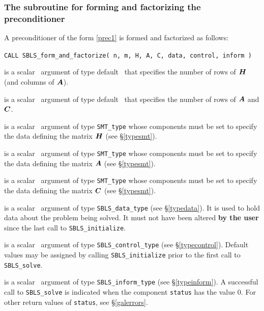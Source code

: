 \documentclass{galahad}
\newcommand{\packagename}{SBLS}
\begin{document}

\subsubsection{The subroutine for forming and factorizing the preconditioner}
A preconditioner of the form \ref{prec1} is formed and factorized as follows:
\vspace*{1mm}

\hspace{8mm}
{\tt CALL \packagename\_form\_and\_factorize( n, m, H, A, C, data, control, inform )}

\begin{description}
 is a scalar \intentin\ argument of type default \integer\ that specifies
the number of rows of ${\bm{H}}$ (and columns of ${\bm{A}}$).

 is a scalar \intentin\ argument of type default \integer\ that specifies
the number of rows of ${\bm{A}}$ and ${\bm{C}}$.

 is a scalar \intentin\ argument of type {\tt SMT\_type} whose
components must be set to specify the data defining the matrix ${\bm{H}}$ 
(see \S\ref{typesmt}).

 is a scalar \intentin\ argument of type {\tt SMT\_type} whose
components must be set to specify the data defining the matrix ${\bm{A}}$ 
(see \S\ref{typesmt}).

 is a scalar \intentin\ argument of type {\tt SMT\_type} whose
components must be set to specify the data defining the matrix ${\bm{C}}$ 
(see \S\ref{typesmt}).

 is a scalar \intentinout\ argument of type 
{\tt \packagename\_data\_type}
(see \S\ref{typedata}). It is used to hold data about the problem being 
solved. It must not have been altered {\bf by the user} since the last call to 
{\tt \packagename\_initialize}.

 is a scalar \intentin\ argument of type 
{\tt \packagename\_control\_type}
(see \S\ref{typecontrol}). Default values may be assigned by calling 
{\tt \packagename\_initialize} prior to the first call to 
{\tt \packagename\_solve}.

 is a scalar \intentout\ argument of type 
{\tt \packagename\_inform\_type}
(see \S\ref{typeinform}). A successful call to
{\tt \packagename\_solve}
is indicated when the  component {\tt status} has the value 0. 
For other return values of {\tt status}, see \S\ref{galerrors}.

\end{description}
\end{document}
